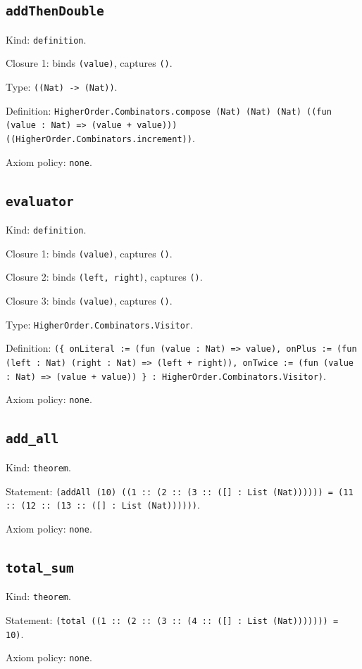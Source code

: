 \documentclass[11pt]{article}
\begin{document}
\subsection*{\texttt{addThenDouble}}
\noindent Kind: \texttt{definition}.\par
\noindent Closure 1: binds \texttt{(value)}, captures \texttt{()}.\par
\noindent Type: \texttt{((Nat) -> (Nat))}.\par
\noindent Definition: \texttt{HigherOrder.Combinators.compose (Nat) (Nat) (Nat) ((fun (value : Nat) => (value + value))) ((HigherOrder.Combinators.increment))}.\par
\noindent Axiom policy: \texttt{none}.\par
\subsection*{\texttt{evaluator}}
\noindent Kind: \texttt{definition}.\par
\noindent Closure 1: binds \texttt{(value)}, captures \texttt{()}.\par
\noindent Closure 2: binds \texttt{(left, right)}, captures \texttt{()}.\par
\noindent Closure 3: binds \texttt{(value)}, captures \texttt{()}.\par
\noindent Type: \texttt{HigherOrder.Combinators.Visitor}.\par
\noindent Definition: \texttt{(\{ onLiteral := (fun (value : Nat) => value), onPlus := (fun (left : Nat) (right : Nat) => (left + right)), onTwice := (fun (value : Nat) => (value + value)) \} : HigherOrder.Combinators.Visitor)}.\par
\noindent Axiom policy: \texttt{none}.\par
\subsection*{\texttt{add\_all}}
\noindent Kind: \texttt{theorem}.\par
\noindent Statement: \texttt{(addAll (10) ((1 :: (2 :: (3 :: ([] : List (Nat)))))) = (11 :: (12 :: (13 :: ([] : List (Nat))))))}.\par
\noindent Axiom policy: \texttt{none}.\par
\subsection*{\texttt{total\_sum}}
\noindent Kind: \texttt{theorem}.\par
\noindent Statement: \texttt{(total ((1 :: (2 :: (3 :: (4 :: ([] : List (Nat))))))) = 10)}.\par
\noindent Axiom policy: \texttt{none}.\par
\end{document}
